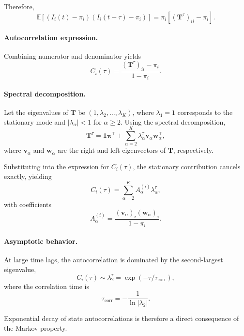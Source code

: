 \documentclass[11pt]{article}
\begin{document}
Therefore,
\begin{equation}
    \mathbb{E}\!\left[(I_i(t)-\pi_i)(I_i(t+\tau)-\pi_i)\right]
    =
    \pi_i \left[(\mathbf{T}^\tau)_{ii} - \pi_i \right].
\end{equation}

\paragraph{Autocorrelation expression.}
Combining numerator and denominator yields
\begin{equation}
    C_i(\tau)
    =
    \frac{(\mathbf{T}^\tau)_{ii} - \pi_i}{1-\pi_i}.
\end{equation}

\paragraph{Spectral decomposition.}
Let the eigenvalues of $\mathbf{T}$ be $(1,\lambda_2,\dots,\lambda_K)$, where
$\lambda_1=1$ corresponds to the stationary mode and
$|\lambda_\alpha|<1$ for $\alpha\ge2$.
Using the spectral decomposition,
\begin{equation}
    \mathbf{T}^\tau
    =
    \mathbf{1}\boldsymbol{\pi}^\top
    + \sum_{\alpha=2}^K \lambda_\alpha^\tau
    \mathbf{v}_\alpha \mathbf{w}_\alpha^\top,
\end{equation}
where $\mathbf{v}_\alpha$ and $\mathbf{w}_\alpha$ are the right and left
eigenvectors of $\mathbf{T}$, respectively.

Substituting into the expression for $C_i(\tau)$, the stationary contribution
cancels exactly, yielding
\begin{equation}
    C_i(\tau)
    =
    \sum_{\alpha=2}^K
    A_\alpha^{(i)} \lambda_\alpha^\tau,
\end{equation}
with coefficients
\begin{equation}
    A_\alpha^{(i)}
    =
    \frac{
        (\mathbf{v}_\alpha)_i (\mathbf{w}_\alpha)_i
    }{
        1-\pi_i
    }.
\end{equation}

\paragraph{Asymptotic behavior.}
At large time lags, the autocorrelation is dominated by the second-largest
eigenvalue,
\begin{equation}
    C_i(\tau) \sim \lambda_2^\tau
    =
    \exp\!\left(-\tau / \tau_{\mathrm{corr}}\right),
\end{equation}
where the correlation time is
\begin{equation}
    \tau_{\mathrm{corr}} = -\frac{1}{\ln|\lambda_2|}.
\end{equation}

Exponential decay of state autocorrelations is therefore a direct consequence
of the Markov property.


\printbibliography
\end{document}
